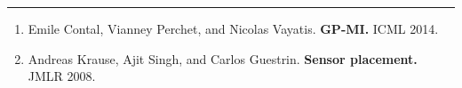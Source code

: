 \documentclass[size36_42,landscape]{a0poster}
\newcommand{\paragraphHeader}[1]{\vspace{1cm}\par{\LARGE\bf\color{darkpastelgreen} \it{\underline{\hspace{.5em}#1\hspace{.5em}}}}\par\vspace{1cm}}
\begin{document}
\begin{multicols}{3}



\hrule
{\normalsize
\begin{enumerate}
\setlength{\parskip}{0pt}
\setlength{\parsep}{0pt}
\setlength{\itemsep}{0pt}
\item
Emile Contal, Vianney Perchet, and Nicolas Vayatis. \textbf{ GP-MI.} ICML 2014. %
\item
Andreas Krause, Ajit Singh, and Carlos Guestrin. \textbf{Sensor placement.} JMLR 2008.

\end{enumerate}}
\end{multicols}
\end{document}
